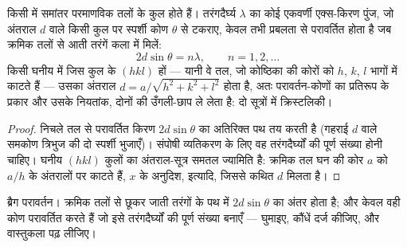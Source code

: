 \begin{proposition}[ब्रैग का नियम]\label{prop:b3:crystalline-solids:bragg}
किसी  में समांतर परमाणविक तलों के कुल होते हैं। तरंगदैर्घ्य
$\lambda$ का कोई एकवर्णी एक्स-किरण पुंज, जो अंतराल
$d$ वाले किसी कुल पर स्पर्शी कोण $\theta$ से टकराए, केवल तभी प्रबलता
से परावर्तित होता है जब क्रमिक तलों से आती तरंगें कला में मिलें:
\[
2d\sin\theta = n\lambda , \qquad n = 1, 2, \dots
\]
किसी घनीय  में जिस कुल के \emph{}
$(hkl)$ हों --- यानी वे तल, जो कोष्ठिका की कोरों को $h$, $k$, $l$
भागों में काटते हैं --- उसका अंतराल $d = a/\sqrt{h^2 + k^2 + l^2}$
होता है, अतः परावर्तन-कोणों का प्रतिरूप  के प्रकार और उसके
नियतांक, दोनों की उँगली-छाप ले लेता है: दो सूत्रों में क्रिस्टलिकी।
\end{proposition}

\begin{proof}
निचले तल से परावर्तित किरण $2d
\sin\theta$ का अतिरिक्त पथ तय करती है (गहराई $d$ वाले समकोण त्रिभुज
की दो स्पर्शी भुजाएँ)। संपोषी व्यतिकरण के लिए वह तरंगदैर्घ्यों की
पूर्ण संख्या होनी चाहिए। घनीय $(hkl)$ कुलों का अंतराल-सूत्र
समतल ज्यामिति है: क्रमिक तल घन की कोर $a$ को
$a/h$ के अंतरालों पर काटते हैं, $x$ के अनुदिश, इत्यादि, जिससे कथित $d$ मिलता है।
\end{proof}

\begin{omfigure}

{\small ब्रैग परावर्तन। क्रमिक तलों से छूकर जाती तरंगों के पथ में
$2d\sin\theta$ का अंतर होता है; और केवल वही कोण परावर्तित करते हैं जो
इसे तरंगदैर्घ्यों की पूर्ण संख्या बनाएँ ---  घुमाइए, कौंधें
दर्ज कीजिए, और वास्तुकला पढ़ लीजिए।}
\end{omfigure}

